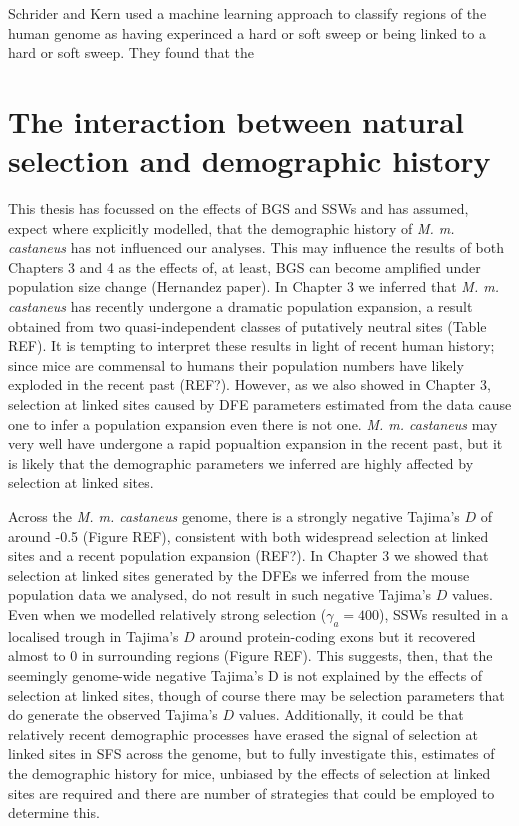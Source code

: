 	Schrider and Kern used a machine learning approach to classify regions of the human genome as having experinced a hard or soft sweep or being linked to a hard or soft sweep. They found that the 

\section{The interaction between natural selection and demographic history}

	This thesis has focussed on the effects of BGS and SSWs and has assumed, expect where explicitly modelled, that the demographic history of \textit{M. m. castaneus} has not influenced our analyses. This may influence the results of both Chapters 3 and 4 as the effects of, at least, BGS can become amplified under population size change (Hernandez paper). In Chapter 3 we inferred that \textit{M. m. castaneus} has recently undergone a dramatic population expansion, a result obtained from two quasi-independent classes of putatively neutral sites (Table REF). It is tempting to interpret these results in light of recent human history; since mice are commensal to humans their population numbers have likely exploded in the recent past (REF?). However, as we also showed in Chapter 3, selection at linked sites caused by DFE parameters estimated from the data cause one to infer a population expansion even there is not one. \textit{M. m. castaneus} may very well have undergone a rapid popualtion expansion in the recent past, but it is likely that the demographic parameters we inferred are highly affected by selection at linked sites.
	
	Across the \textit{M. m. castaneus} genome, there is a strongly negative Tajima's $D$ of around -0.5 (Figure REF), consistent with both widespread selection at linked sites and a recent population expansion (REF?). In Chapter 3 we showed that selection at linked sites generated by the DFEs we inferred from the mouse population data we analysed, do not result in such negative Tajima's $D$ values. Even when we modelled relatively strong selection ($\gamma_a = 400$), SSWs resulted in a localised trough in Tajima's $D$ around protein-coding exons but it recovered almost to 0 in surrounding regions (Figure REF). This suggests, then, that the seemingly genome-wide negative Tajima's D is not explained by the effects of selection at linked sites, though of course there may be selection parameters that do generate the observed Tajima's $D$ values. Additionally, it could be that relatively recent demographic processes have erased the signal of selection at linked sites in SFS across the genome, but to fully investigate this, estimates of the demographic history for mice, unbiased by the effects of selection at linked sites are required and there are number of strategies that could be employed to determine this.
	
